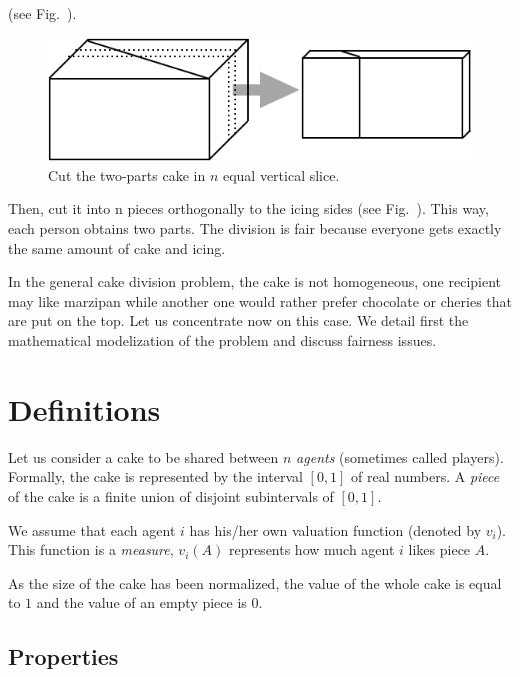 \begin{itemize}
(see Fig.~\label{Fig:cakeHomogeneous3}).
\begin{figure}[htb]
\begin{center}
        \includegraphics[scale=0.4]{FiguresMaths/CakeHomogeneous3}
        \caption{Cut the two-parts cake in $n$ equal vertical slice.}
        \label{Fig:cakeHomogeneous3}
\end{center}
\end{figure}
Then, cut it into n pieces orthogonally to the icing sides (see Fig.~\label{Fig:cakeHomogeneous3}). 
This way, each person obtains two parts. 
The division is fair because everyone gets exactly the same amount of cake and icing. 
\end{itemize}

In the general cake division problem, the cake is not homogeneous, 
one recipient may like marzipan while another one would rather prefer chocolate or cheries
that are put on the top.
Let us concentrate now on this case.
We detail first the mathematical modelization of the problem and discuss fairness issues. 

\section{Definitions}

Let us consider a cake to be shared between $n$ \textit{agents} (sometimes called players). 
Formally, the cake is represented by the interval $[0,1]$ of real numbers.
A \textit{piece} of the cake is a finite union of disjoint subintervals of $[0,1]$.

We assume that each agent $i$ has his/her own valuation function (denoted by $v_i$).
This function is a \textit{measure}, $v_i(A)$ represents how much agent $i$ likes piece $A$. 

As the size of the cake has been normalized, the value of the whole cake is equal to $1$
and the value of an empty piece is $0$.

\subsection{Properties}

